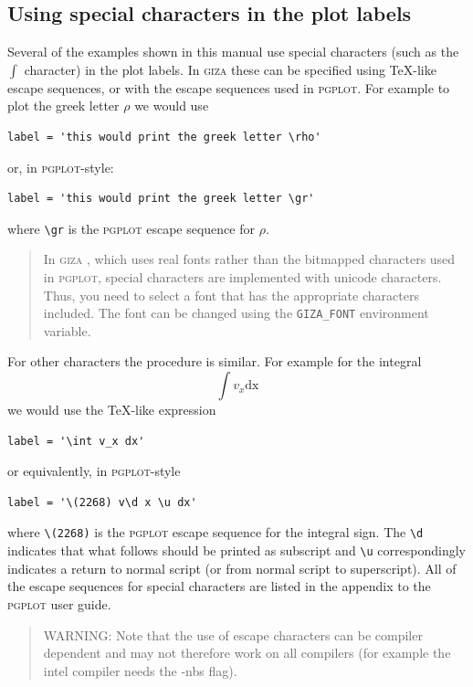 \documentclass[a4paper,10pt]{article}
\newcommand{\giza}{\textsc{giza }}
\begin{document}
\subsection{Using special characters in the plot labels}
 Several of the examples shown in this manual use special characters (such as
the $\int$ character) in the plot labels. In \giza these can be specified using \TeX-like escape sequences, or with the escape sequences used in \textsc{pgplot}. For example to plot the greek letter $\rho$ we would use
\begin{verbatim}
label = 'this would print the greek letter \rho'
\end{verbatim}
or, in \textsc{pgplot}-style:
\begin{verbatim}
label = 'this would print the greek letter \gr'
\end{verbatim}
where \verb+\gr+ is the \textsc{pgplot} escape sequence for $\rho$.
\begin{quote}
 In \giza, which uses real fonts rather than the bitmapped characters used in \textsc{pgplot}, special characters are implemented with unicode characters. Thus, you need to select a font that has the appropriate characters included. The font can be changed using the \verb+GIZA_FONT+ environment variable.
\end{quote}
For other characters the procedure is similar. For example for the integral 
\begin{equation}
\int v_x \mathrm{dx}
\end{equation}
we would use the \TeX-like expression
\begin{verbatim}
label = '\int v_x dx'
\end{verbatim}
or equivalently, in \textsc{pgplot}-style
\begin{verbatim}
label = '\(2268) v\d x \u dx'
\end{verbatim}
where \verb+\(2268)+ is the \textsc{pgplot} escape sequence for the integral sign. The
\verb+\d+ indicates that what follows should be printed as subscript and
\verb+\u+ correspondingly indicates a return to normal script (or from normal script to
superscript). All of the escape sequences for special characters are listed in
the appendix to the \textsc{pgplot} user guide.
\begin{quote}
 WARNING: Note that the use of escape characters can be compiler dependent and
 may not therefore work on all compilers (for example the intel compiler needs
 the -nbs flag).
\end{quote}
\end{document}

